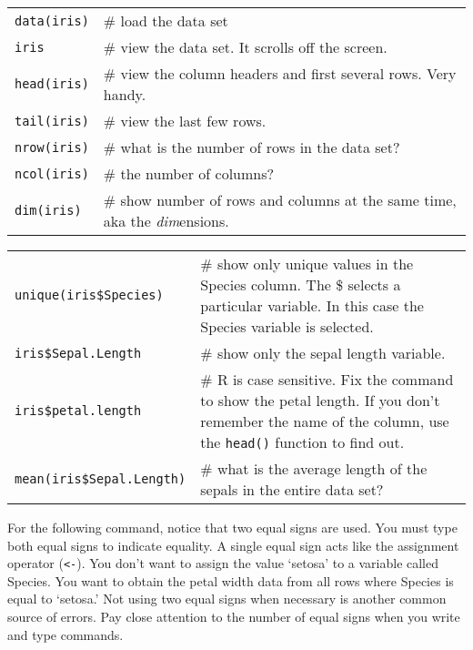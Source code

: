 \documentclass[11pt]{article}
\begin{document}
\begin{tabular}{@{}L{1in}L{4.5in}@{}}
\texttt{data(iris)} 	& \# load the data set \\

\texttt{iris} 			& \# view the data set. It scrolls off the screen. \\

\texttt{head(iris)} 	& \# view the column headers and first several rows. Very
handy.\\

\texttt{tail(iris)}		& \# view the last few rows. \\

\texttt{nrow(iris)} 	& \# what is the number of rows in the data set?\\

\texttt{ncol(iris)} 	& \# the number of columns? \\

\texttt{dim(iris)} 		& \# show number of rows and columns at the same time, aka the \emph{dim}ensions.\\
\end{tabular}

\begin{tabular}{@{}L{1.75in}L{3.75in}@{}}
\texttt{unique(iris\$Species)} & \# show only unique values in the Species column. The \$ selects a particular variable. In this case the Species variable is selected.\\

\texttt{iris\$Sepal.Length} & \# show only the sepal length variable.\\

\texttt{iris\$petal.length} & \# R is case sensitive. Fix the command to show the
petal length. If you don't remember the name of the column, use the \texttt{head()} function to find out.\\

\texttt{mean(iris\$Sepal.Length)} & \# what is the average length of the sepals in
the entire data set?\\

\end{tabular}

For the following command, notice that two equal signs are used. You must type 
both equal signs to indicate equality. A single equal sign
acts like the assignment operator (\texttt{\textless{}-}). You don't want to
assign the value `setosa' to a variable called Species. You want to
obtain the petal width data from all rows where Species is equal to
`setosa.' Not using two equal signs when necessary is another common
source of errors. Pay close attention to the number of equal signs when
you write and type commands. 
\end{document}
